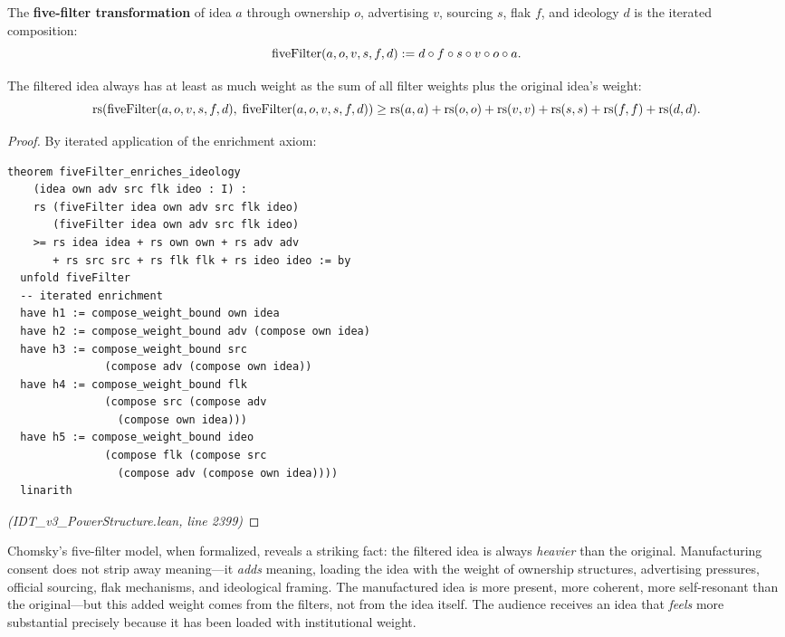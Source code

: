 \begin{definition}
\label{def:five-filters}
The \textbf{five-filter transformation} of idea $a$ through ownership $o$,
advertising $v$, sourcing $s$, flak $f$, and ideology $d$ is the iterated
composition:
\[
  \mathrm{fiveFilter}(a, o, v, s, f, d) := d \circ f \circ s \circ v \circ o \circ a.
\]
\end{definition}

\begin{theorem}
\label{thm:five-filters-enrich}
The filtered idea always has at least as much weight as the sum of all filter
weights plus the original idea's weight:
\[
  \mathrm{rs}(\mathrm{fiveFilter}(a, o, v, s, f, d),\; \mathrm{fiveFilter}(a, o, v, s, f, d))
  \geq \mathrm{rs}(a,a) + \mathrm{rs}(o,o) + \mathrm{rs}(v,v) + \mathrm{rs}(s,s) + \mathrm{rs}(f,f) + \mathrm{rs}(d,d).
\]
\end{theorem}

\begin{proof}
By iterated application of the enrichment axiom:
\begin{lstlisting}
theorem fiveFilter_enriches_ideology
    (idea own adv src flk ideo : I) :
    rs (fiveFilter idea own adv src flk ideo)
       (fiveFilter idea own adv src flk ideo)
    >= rs idea idea + rs own own + rs adv adv
       + rs src src + rs flk flk + rs ideo ideo := by
  unfold fiveFilter
  -- iterated enrichment
  have h1 := compose_weight_bound own idea
  have h2 := compose_weight_bound adv (compose own idea)
  have h3 := compose_weight_bound src
               (compose adv (compose own idea))
  have h4 := compose_weight_bound flk
               (compose src (compose adv
                 (compose own idea)))
  have h5 := compose_weight_bound ideo
               (compose flk (compose src
                 (compose adv (compose own idea))))
  linarith
\end{lstlisting}
\textit{(IDT\_v3\_PowerStructure.lean, line 2399)}
\end{proof}

\begin{interpretation}
Chomsky's five-filter model, when formalized, reveals a striking fact: the
filtered idea is always \emph{heavier} than the original. Manufacturing consent
does not strip away meaning---it \emph{adds} meaning, loading the idea with the
weight of ownership structures, advertising pressures, official sourcing, flak
mechanisms, and ideological framing. The manufactured idea is more present, more
coherent, more self-resonant than the original---but this added weight comes
from the filters, not from the idea itself. The audience receives an idea that
\emph{feels} more substantial precisely because it has been loaded with
institutional weight.
\end{interpretation}

